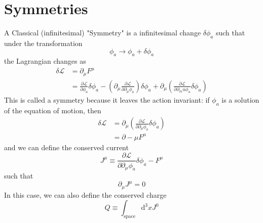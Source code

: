 \documentclass[a4paper]{book}
\theoremstyle{definition}
\theoremstyle{remark}
\begin{document}
\section{Symmetries}
A Classical (infinitesimal) "Symmetry" is a infinitesimal change $\delta \phi_a$ such that under the transformation
\begin{equation}
    \phi_a \rightarrow \phi_a + \delta \phi_a 
\end{equation}
the Lagrangian changes as 
\begin{equation}
    \begin{aligned}
        \delta \mathcal{L} &= \partial_\mu F^\mu \\
        &= \frac{\partial \mathcal{L}}{\partial \phi_a} \delta \phi_a - \left(\partial_\mu \frac{\partial \mathcal{L}}{\partial \partial_\mu \phi_a}\right)\delta \phi_a + \partial_\mu \left(\frac{\partial \mathcal{L}}{\partial \partial_mu \phi_a}\delta\phi_a\right)
    \end{aligned}
\end{equation}
This is called a symmetry because it leaves the action invariant: if $\phi_a$ is a solution of the equation of motion, then 
\begin{equation}
        \begin{aligned}
            \delta \mathcal{L} &= \partial_\mu \left(\frac{\partial \mathcal{L}}{\partial \partial_\mu \phi_a}\delta \phi_a \right) \\
            &= \partial-\mu F^\mu 
        \end{aligned}
\end{equation}
and we can define the conserved current 
\begin{equation}
    J^\mu \equiv \frac{\partial \mathcal{L}}{\partial \partial_\mu \phi_a} \delta\phi_a - F^\mu 
\end{equation}
such that 
\begin{equation}
    \partial _\mu J^\mu = 0
\end{equation}
In this case, we can also define the conserved charge 
\begin{equation}
    Q \equiv \int_{\text{space}} \text{d}^3 x J^0
\end{equation}
\end{document}
